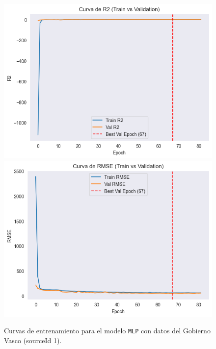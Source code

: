 \begin{figure}[H]
\begin{minipage}{0.48\textwidth}
		\includegraphics[width=\linewidth]{includes/cap5/graphs/sid1_mlp_r2.png}
		\vspace{0.2cm}
		\includegraphics[width=\linewidth]{includes/cap5/graphs/sid1_mlp_rmse.png}
	\end{minipage}
	\caption{Curvas de entrenamiento para el modelo \texttt{MLP} con datos del Gobierno Vasco (sourceId 1).}
	\label{fig:curvas_sid1_mlp}
\end{figure}

